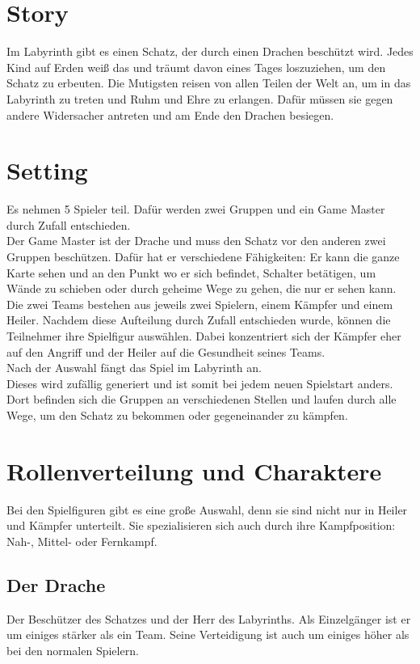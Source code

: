 \documentclass[10pt,a4paper,notitlepage]{report}
\begin{document}
\begin{flushleft}
\section{Story}
Im Labyrinth gibt es einen Schatz, der durch einen Drachen beschützt wird. Jedes Kind auf Erden weiß das und träumt davon eines Tages loszuziehen, um den Schatz zu erbeuten. Die Mutigsten reisen von allen Teilen der Welt an, um in das Labyrinth zu treten und Ruhm und Ehre zu erlangen. Dafür müssen sie gegen andere Widersacher antreten und am Ende den Drachen besiegen.\\
\section{Setting}
Es nehmen 5 Spieler teil. Dafür werden zwei Gruppen und ein Game Master durch Zufall entschieden.\\
Der Game Master ist der Drache und muss den Schatz vor den anderen zwei Gruppen beschützen. Dafür hat er verschiedene Fähigkeiten: Er kann die ganze Karte sehen und an den Punkt wo er sich befindet, Schalter betätigen, um Wände zu schieben oder durch geheime Wege zu gehen, die nur er sehen kann.\\
Die zwei Teams bestehen aus jeweils zwei Spielern, einem Kämpfer und einem Heiler. Nachdem diese Aufteilung durch Zufall entschieden wurde, können die Teilnehmer ihre Spielfigur auswählen. Dabei konzentriert sich der Kämpfer eher auf den Angriff und der Heiler auf die Gesundheit seines Teams.\\
Nach der Auswahl fängt das Spiel im Labyrinth an. \\
Dieses wird zufällig generiert und ist somit bei jedem neuen Spielstart anders. Dort befinden sich die Gruppen an verschiedenen Stellen und laufen durch alle Wege, um den Schatz zu bekommen oder gegeneinander zu kämpfen.\\
\section{Rollenverteilung und Charaktere}
Bei den Spielfiguren gibt es eine große Auswahl, denn sie sind nicht nur in Heiler und Kämpfer unterteilt. Sie spezialisieren sich auch durch ihre Kampfposition: Nah-, Mittel- oder Fernkampf.\\
\subsection{Der Drache} 
Der Beschützer des Schatzes und der Herr des Labyrinths. Als Einzelgänger ist er um einiges stärker als ein Team. Seine Verteidigung ist auch um einiges höher als bei den normalen Spielern.\\

\end{flushleft}
\end{document}
